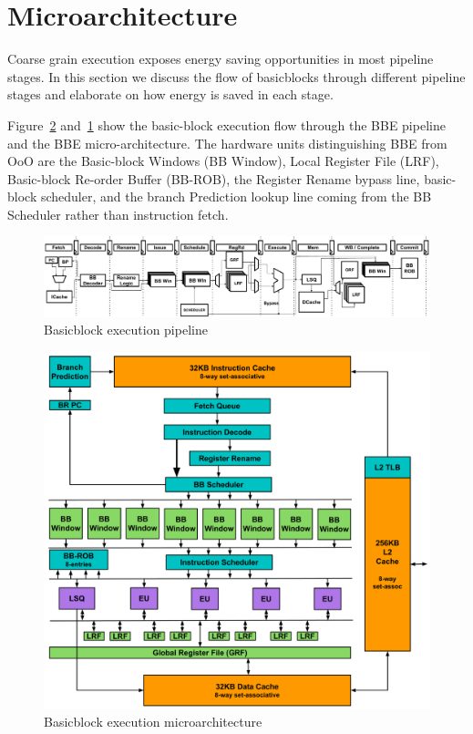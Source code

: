 \section{Microarchitecture}
\label{sec:uarch}

Coarse grain execution exposes energy saving opportunities in most pipeline
stages. In this section we discuss the flow of basicblocks through different
pipeline stages and elaborate on how energy is saved in each stage.

Figure~\ref{fig:bb_arch} and~\ref{fig:pipeline} show the basic-block execution
flow through the BBE pipeline and the BBE micro-architecture. The hardware units
distinguishing BBE from OoO are the Basic-block Windows (BB Window), Local Register
File (LRF), Basic-block Re-order Buffer (BB-ROB), the Register Rename bypass
line, basic-block scheduler, and the branch Prediction lookup line coming 
from the BB Scheduler rather than instruction fetch.

\begin{figure}
	\centering
	\includegraphics[width=\textwidth]{fig/pipeline.pdf} 
	\caption{Basicblock execution pipeline}
	\label{fig:pipeline}
\end{figure}

\begin{figure}
	\centering
	\includegraphics[width=1.0\columnwidth]{fig/bb_architecture.pdf} 
	\caption{Basicblock execution microarchitecture}
	\label{fig:bb_arch}
\end{figure}

